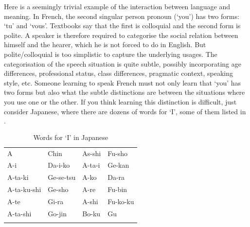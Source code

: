 Here is a seemingly trivial example of the interaction 
between language and meaning. In French, the second singular person
pronoun (`you') has two forms: 
`tu' and `vous'. Textbooks say that the first is colloquial 
and the second form is polite. A speaker is therefore
required to categorise the social relation between himself
and the hearer, which he is not forced to do in English. 
But polite/colloquial is too simplistic to capture the 
underlying usages. The categorisation of the speech 
situation is quite subtle, possibly incorporating
age differences, professional status, 
class differences, pragmatic context, speaking 
style, etc. Someone learning to speak French must not 
only learn that `you' has two forms but also what the 
subtle distinctions are between the situations where 
you use one or the other. If you think learning this distinction
is difficult, just consider Japanese, where there are 
dozens of words for `I', some of them listed in .


\begin{table} 
\caption{Words for `I' in Japanese}
\label{tab:7:japanese}
\begin{tabular}{llll}
\lsptoprule
A            &  Chin       &      As-shi    &        Fu-sho\\
A-i          &  Da-i-ko    &      A-ta-i    &        Ge-kan\\
A-ta-ki      &  Ge-se-tsu  &      A-ko      &        Da-ra\\
A-ta-ku-shi  &  Ge-sho     &      A-re      &        Fu-bin\\
A-te         &  Gi-ra      &      A-shi     &        Fu-ko-ku\\
A-ta-shi     &  Go-jin     &      Bo-ku     &        Gu           \\
\lspbottomrule
\end{tabular}
\end{table}

